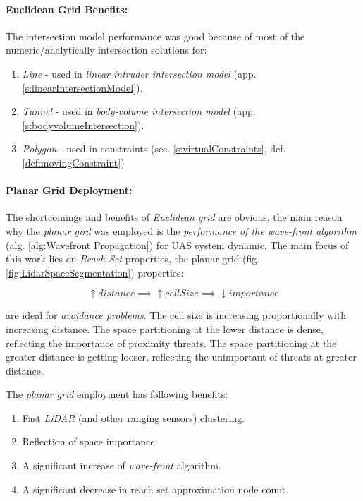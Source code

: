 \paragraph{Euclidean Grid Benefits:} The intersection model performance was good because of most of the numeric/analytically intersection solutions for:
\begin{enumerate}
    \item \emph{Line} - used in \emph{linear intruder intersection model} (app. \ref{s:linearIntersectionModel}).
    
    \item \emph{Tunnel} - used in \emph{body-volume intersection model} (app. \ref{s:bodyvolumeIntersection}).
    
    \item \emph{Polygon} - used in constraints (sec. \ref{s:virtualConstraints}, def. \ref{def:movingConstraint})
\end{enumerate}

\paragraph{Planar Grid Deployment:} The shortcomings and benefits of \emph{Euclidean grid} are obvious, the main reason why the \emph{planar gird} was employed is the \emph{performance of the wave-front algorithm} (alg. \ref{alg:Wavefront Propagation}) for UAS system dynamic. The main focus of this work lies on \emph{Reach Set} properties, the planar grid (fig. \ref{fig:LidarSpaceSegmentation}) properties:

\begin{equation*}
    \uparrow distance \implies \uparrow cell Size \implies \downarrow importance
\end{equation*}

\noindent are ideal for \emph{avoidance problems}. The cell size is increasing proportionally with increasing distance. The space partitioning at the lower distance is dense, reflecting the importance of proximity threats. The space partitioning at the greater distance is getting looser, reflecting the unimportant of threats at greater distance. 

\newpage
\noindent The \emph{planar grid} employment has following benefits:
\begin{enumerate}
    \item Fast \emph{LiDAR} (and other ranging sensors) clustering.
    \item Reflection of space importance.
    \item A significant increase of \emph{wave-front} algorithm.
    \item A significant decrease in reach set approximation node count.
\end{enumerate}

